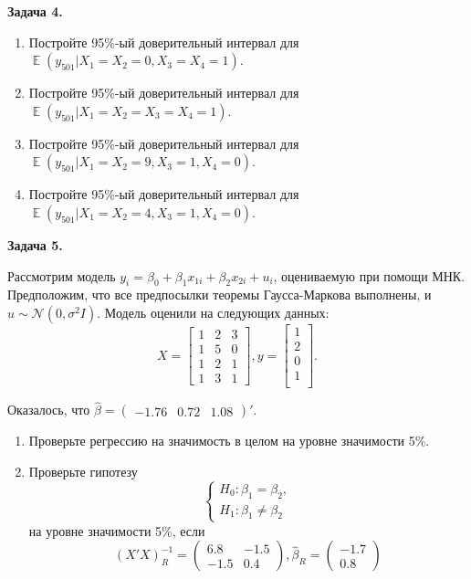 \documentclass[10pt, a4paper]{extarticle}
\DeclareMathOperator{\E}{\mathbb{E}}
\begin{document}
	{\Large \textbf{Задача 4.}}
	\begin{enumerate}[label=\alph*)]
		\item Постройте 95\%-ый доверительный интервал для $\E(y_{501} | X_1 = X_2 = 0, X_3 = X_4 = 1)$.
		\item Постройте 95\%-ый доверительный интервал для $\E(y_{501} | X_1 = X_2 = X_3 = X_4 = 1)$.
		\item Постройте 95\%-ый доверительный интервал для $\E(y_{501} | X_1 = X_2 = 9, X_3 = 1, X_4 = 0)$.
		\item Постройте 95\%-ый доверительный интервал для $\E(y_{501} | X_1 = X_2 = 4, X_3 = 1, X_4 = 0)$.
	\end{enumerate}
	\vspace{1em}

	{\Large \textbf{Задача 5.}}
	
	Рассмотрим модель $y_i = \beta_0 + \beta_1x_{1i} + \beta_2x_{2i} + u_i$, оцениваемую при помощи МНК. Предположим, что все предпосылки теоремы Гаусса-Маркова выполнены, и $u \sim \mathcal{N}(0, \sigma^2I)$. Модель оценили на следующих данных:
	\[
	X = \begin{bmatrix}
		1 & 2 & 3 \\
		1 & 5 & 0 \\
		1 & 2 & 1 \\
		1 & 3 & 1
	\end{bmatrix},
	y = \begin{bmatrix}
		1 \\
		2 \\
		0 \\
		1 \\
	\end{bmatrix}.
	\]
	
	Оказалось, что $\hat{\beta} = \begin{pmatrix}
		-1.76 & 0.72 & 1.08
	\end{pmatrix}'$.

	\begin{enumerate}[label=\alph*)]
		\item Проверьте регрессию на значимость в целом на уровне значимости 5\%.
		\item Проверьте гипотезу
		\[
		\begin{cases}
			H_0: \beta_1 = \beta_2, \\
			H_1: \beta_1 \ne \beta_2
		\end{cases}
		\]
		на уровне значимости 5\%, если 
		\[
		(X'X)^{-1}_R = \begin{pmatrix}
			6.8 & -1.5 \\
			-1.5 &  0.4
		\end{pmatrix}, \hat{\beta}_R = \begin{pmatrix}
		-1.7 \\
		0.8
	\end{pmatrix}
		\]
	\end{enumerate}
	\vspace{1em}
	
\end{document}
